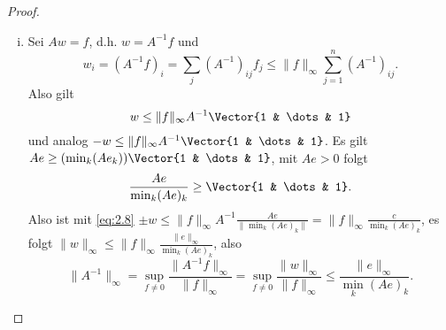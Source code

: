 \begin{st}[$M$-Kriterium]
\begin{proof}
\begin{enumerate}[i)]
\begin{seg}{\ProofImplication*}
				\end{seg}
			\item
				Sei $Aw = f$, d.h. $w = A^{-1} f$ und
				\[
					w_i = (A^{-1}f)_i = \sum_{j} (A^{-1})_{ij} f_j \le \|f\|_\infty \sum_{j=1}^n (A^{-1})_{ij}.
				\]
				Also gilt
				\begin{equation} \label{eq:2.8}
					w \le \|f\|_\infty A^{-1} \Vector{1 & \dots & 1}
				\end{equation}
				und analog $-w \le \|f\|_\infty A^{-1} \Vector{1 & \dots & 1}$.
				Es gilt $Ae \ge (\min_k (Ae_k)) \Vector{1 & \dots & 1}$, mit $Ae > 0$ folgt
				\[
					\frac{Ae}{\min_k (Ae)_k} \ge \Vector{1 & \dots & 1}.
				\]
				Also ist mit \eqref{eq:2.8} $\pm w \le \|f\|_\infty A^{-1} \frac{Ae}{\|\min_k (Ae)_k\|} = \|f\|_\infty \frac{c}{\min_k (Ae)_k}$, es folgt $\|w\|_\infty \le \|f\|_\infty \frac{\|e\|_\infty}{\min_k(Ae)_k}$, also
				\[
					\|A^{-1}\|_\infty
					= \sup_{f\neq 0} \frac{\|A^{-1} f\|_\infty}{\|f\|_\infty}
					= \sup_{f \neq 0} \frac{\|w\|_\infty}{\|f\|_\infty}
					\le \frac{\|e\|_\infty}{\min_k (Ae)_k}.
				\]
		\end{enumerate}
	\end{proof}
\end{st}

